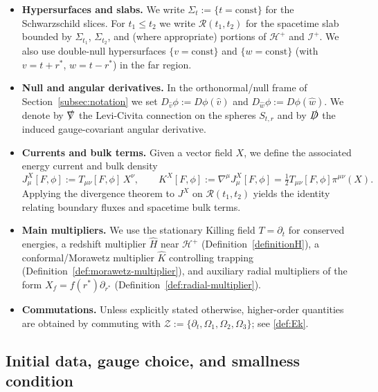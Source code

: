 \documentclass[11pt]{article}
\numberwithin{equation}{section}
\theoremstyle{plain}
\theoremstyle{definition}
\theoremstyle{remark}
\begin{document}
\begin{itemize}
\item \textbf{Hypersurfaces and slabs.}
We write $\Sigma_{t}:=\{t=\mathrm{const}\}$ for the Schwarzschild slices.
For $t_{1}\le t_{2}$ we write $\mathcal R(t_{1},t_{2})$ for the spacetime slab bounded by $\Sigma_{t_{1}}$, $\Sigma_{t_{2}}$, and (where appropriate) portions of $\mathcal H^{+}$ and $\mathcal I^{+}$.
We also use double-null hypersurfaces $\{v=\mathrm{const}\}$ and $\{w=\mathrm{const}\}$ (with $v=t+r^{\ast}$, $w=t-r^{\ast}$) in the far region.

\item \textbf{Null and angular derivatives.}
In the orthonormal/null frame of Section~\ref{subsec:notation} we set $D_{\hat v}\phi:=D\phi(\hat v)$ and $D_{\hat w}\phi:=D\phi(\hat w)$.
We denote by $\slashed{\nabla}$ the Levi-Civita connection on the spheres $S_{t,r}$ and by $\slashed D$ the induced gauge-covariant angular derivative.

\item \textbf{Currents and bulk terms.}
Given a vector field $X$, we define the associated energy current and bulk density
\begin{equation}
J^{X}_{\mu}[F,\phi]:=T_{\mu\nu}[F,\phi]\,X^{\nu},
\qquad
K^{X}[F,\phi]:=\nabla^{\mu}J^{X}_{\mu}[F,\phi]=\tfrac12 T_{\mu\nu}[F,\phi]\pi^{\mu\nu}(X).
\end{equation}
Applying the divergence theorem to $J^{X}$ on $\mathcal R(t_{1},t_{2})$ yields the identity relating boundary fluxes and spacetime bulk terms.

\item \textbf{Main multipliers.}
We use the stationary Killing field $T=\partial_{t}$ for conserved energies,
a redshift multiplier $\hat H$ near $\mathcal H^{+}$ (Definition~\ref{definitionH}),
a conformal/Morawetz multiplier $\hat K$ controlling trapping (Definition~\ref{def:morawetz-multiplier}),
and auxiliary radial multipliers of the form $X_{f}=f(r^{\ast})\partial_{r^{\ast}}$ (Definition~\ref{def:radial-multiplier}).

\item \textbf{Commutations.}
Unless explicitly stated otherwise, higher-order quantities are obtained by commuting with $\mathcal Z:=\{\partial_{t},\Omega_{1},\Omega_{2},\Omega_{3}\}$; see \eqref{def:Ek}.
\end{itemize}

\medskip
\subsection{Initial data, gauge choice, and smallness condition}\label{subsec:initial-data}
\end{document}
